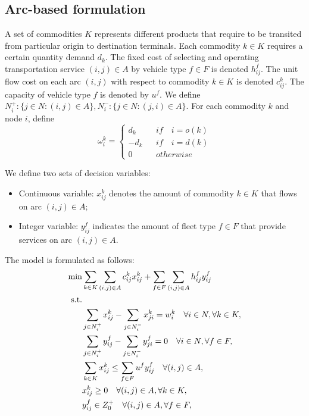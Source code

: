 \documentclass[11pt,nonblindrev,fleqn]{article}
\begin{document}
\subsection{Arc-based formulation}
A set of commodities $K$ represents different products that require to be transited from particular origin to destination terminals. Each commodity $k\in K$ requires a certain quantity demand $d_k$. The fixed cost of selecting and operating transportation service $(i,j)\in A$ by vehicle type $f\in F$ is denoted $h_{ij}^f$. The unit flow cost on each arc $(i,j)$ with respect to commodity $k\in K$ is denoted $c_{ij}^k$. The capacity of vehicle type $f$ is denoted by $u^f$. We define $N_i^+:\{j\in N:(i,j)\in A\},N_i^-:\{j\in N:(j,i)\in A\}$. For each commodity $k$ and node $i$, define
\begin{equation*}
\omega_i^k= \left\{
\begin{aligned}
d_k &  & if \quad i=o(k) \\
-d_k &  & if \quad i=d(k) \\
0 &  & otherwise
\end{aligned}
\right.
\end{equation*}

We define two sets of decision variables:
\begin{itemize}
  \item Continuous variable: $x_{ij}^k$ denotes the amount of commodity $k\in K$ that flows on arc $(i,j)\in A$;
  \item Integer variable: $y_{ij}^f$ indicates the amount of fleet type $f\in F$ that provide services on arc $(i,j)\in A$.
\end{itemize}

The model is formulated as follows:
\begin{align}
  \min & \sum_{k\in K}\sum_{(i,j)\in A} c_{ij}^k x_{ij}^k + \sum_{f\in F}\sum_{(i,j)\in A}h_{ij}^f y_{ij}^f    \label{objA}  \\
  \rm{s.t.} \nonumber  \\
         &  \sum_{j\in N_i^+}x_{ij}^k - \sum_{j\in N_i^-}x_{ji}^k = w_i^k     \quad     \forall i\in N, \forall k\in K,     \label{demandA}  \\
         &   \sum_{j\in N_i^+}y_{ij}^f - \sum_{j\in N_i^-}y_{ji}^f = 0  \quad     \forall i\in N, \forall f\in F,   \label{dbA} \\
         &   \sum_{k\in K}x_{ij}^k \leq \sum_{f\in F}u^f y_{ij}^f  \quad  \forall (i,j)\in A,   \label{capacityA} \\
         &    x_{ij}^k \geq 0  \quad  \forall (i,j)\in A, \forall k\in K,   \label{xA} \\
         &   y_{ij}^f \in Z_0^+  \quad  \forall (i,j)\in A,\forall f\in F, \label{yA}
\end{align}
\end{document}
